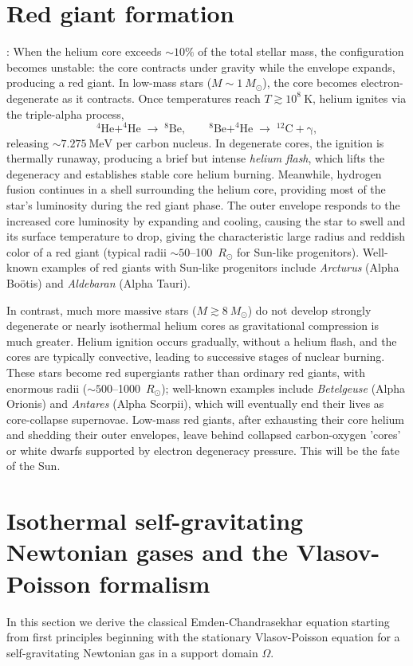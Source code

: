 \documentclass[12pt,a4paper]{article}
\numberwithin{equation}{section}
\begin{document}
\section*{Red giant formation}: When the helium core exceeds $\sim 10\%$ of the total stellar mass, the configuration becomes unstable: the core contracts under gravity while the envelope expands, producing a red giant. In low-mass stars ($M \sim 1~M_\odot$), the core becomes electron-degenerate as it contracts. Once temperatures reach $T \gtrsim 10^8~\mathrm{K}$, helium ignites via the triple-alpha process,
\begin{equation}
\mathrm{^4He + ^4He \;\longrightarrow\; ^8Be}, \qquad
^8\mathrm{Be + ^4He \;\longrightarrow\; ^{12}C + \gamma},
\end{equation}
releasing $\sim 7.275~\mathrm{MeV}$ per carbon nucleus. In degenerate cores, the ignition is thermally runaway, producing a brief but intense \emph{helium flash}, which lifts the degeneracy and establishes stable core helium burning. Meanwhile, hydrogen fusion continues in a shell surrounding the helium core, providing most of the star's luminosity during the red giant phase. The outer envelope responds to the increased core luminosity by expanding and cooling, causing the star to swell and its surface temperature to drop, giving the characteristic large radius and reddish color of a red giant (typical radii $\sim 50$–100~$R_\odot$ for Sun-like progenitors). Well-known examples of red giants with Sun-like progenitors include \emph{Arcturus} (Alpha Boötis) and \emph{Aldebaran} (Alpha Tauri).

In contrast, much more massive stars ($M \gtrsim 8~M_\odot$) do not develop strongly degenerate or nearly isothermal helium cores as gravitational compression is much greater. Helium ignition occurs gradually, without a helium flash, and the cores are typically convective, leading to successive stages of nuclear burning. These stars become red supergiants rather than ordinary red giants, with enormous radii ($\sim 500$–1000~$R_\odot$); well-known examples include \emph{Betelgeuse} (Alpha Orionis) and \emph{Antares} (Alpha Scorpii), which will eventually end their lives as core-collapse supernovae. Low-mass red giants, after exhausting their core helium and shedding their outer envelopes, leave behind collapsed carbon-oxygen 'cores' or white dwarfs supported by electron degeneracy pressure. This will be the fate of the Sun.


\section{Isothermal self-gravitating Newtonian gases and the Vlasov-Poisson formalism}
In this section we derive the classical Emden-Chandrasekhar equation starting from first principles beginning with the stationary Vlasov-Poisson equation for a self-gravitating Newtonian gas in a support domain $\Omega$.
\end{document}
